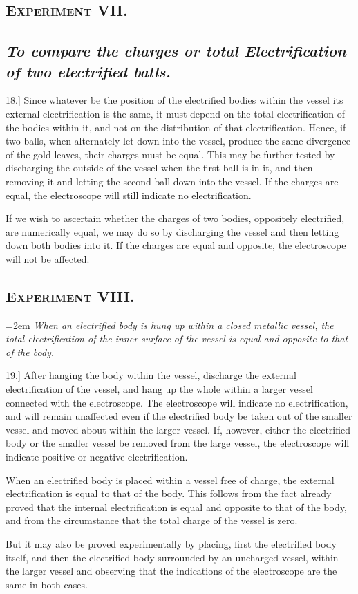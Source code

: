 \documentclass[12pt,oneside]{book}[2021/10/04]
\newcommand{\Heading}{\centering\normalfont}
\newcommand{\Section}[1]{\subsection*{\normalsize\Heading\scshape #1}}
\newcommand{\Subsection}[1]{\subsection*{\normalsize\Heading\itshape #1}}
\newcommand{\Runhead}[1]{\fancyhead[C]{\iffloatpage{}{\small#1}}}
\newcommand{\article}[1]{\phantomsection \label{art:#1}{#1.]}}
\newcommand{\hangpara}[1]{\hangindent=2em {\itshape #1} \vspace{1ex}}
\newcommand{\¬}{\hphantom{0}}
\begin{document}
\Section{Experiment VII.}

\Subsection{To compare the charges or total Electrification of two
electrified balls.}

\article{18} Since whatever be the position of the electrified bodies
within the vessel its external electrification is the same, it must
depend on the total electrification of the bodies within it, and
not on the distribution of that electrification. Hence, if two balls,
when alternately let down into the vessel, produce the same divergence
of the gold leaves, their charges must be equal. This may
be further tested by discharging the outside of the vessel when
the first ball is in it, and then removing it and letting the second
ball down into the vessel. If the charges are equal, the electroscope
will still indicate no electrification.
\Runhead{COMPARISON OF CHARGES.}

If we wish to ascertain whether the charges of two bodies,
oppositely electrified, are numerically equal, we may do so by
discharging the vessel and then letting down both bodies into
it. If the charges are equal and opposite, the electroscope will not
be affected.

\Section{Experiment VIII.}

\hangpara{
When an electrified body is hung up within a closed metallic vessel,
the total electrification of the inner surface of the vessel is equal
and opposite to that of the body.
}

\article{19} After hanging the body within the vessel, discharge the
external electrification of the vessel, and hang up the whole within
a larger vessel connected with the electroscope. The electroscope
will indicate no electrification, and will remain unaffected even
if the electrified body be taken out of the smaller vessel and moved
about within the larger vessel. If, however, either the electrified
body or the smaller vessel be removed from the large vessel, the
electroscope will indicate positive or negative electrification.

When an electrified body is placed within a vessel free of charge,
the external electrification is equal to that of the body. This
follows from the fact already proved that the internal electrification
is equal and opposite to that of the body, and from the circumstance
that the total charge of the vessel is zero.

But it may also be proved experimentally by placing, first the
electrified body itself, and then the electrified body surrounded
by an uncharged vessel, within the larger vessel and observing
that the indications of the electroscope are the same in both
cases.
\end{document}
